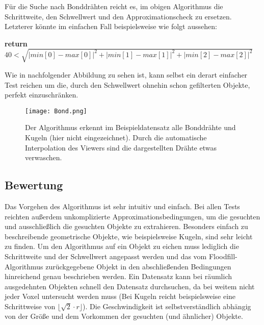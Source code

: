 Für die Suche nach Bonddrähten reicht es, im obigen Algorithmus die Schrittweite, den Schwellwert und den Approximationscheck zu ersetzen. Letzterer könnte im einfachen Fall beispielsweise wie folgt aussehen:
\newline
\begin{algorithmic}
\State \bf{return} $40 < \sqrt{|min[0]-max[0]|^2 + |min[1]-max[1]|^2 + |min[2]-max[2]|^2}$
\EndProcedure \newline
\end{algorithmic}

Wie in nachfolgender Abbildung zu sehen ist, kann selbst ein derart einfacher Test reichen um die, durch den Schwellwert ohnehin schon gefilterten Objekte, perfekt einzuschränken.

\begin{figure}[H]
  \begin{center}
    \texttt{[image: Bond.png]}
    \caption{Der Algorithmus erkennt im Beispieldatensatz alle Bonddrähte und Kugeln (hier nicht eingezeichnet). Durch die automatische Interpolation des Viewers sind die dargestellten Drähte etwas verwaschen.}
    \label{fig:Bond}
  \end{center}
\end{figure} 

\subsection{Bewertung}
Das Vorgehen des Algorithmus ist sehr intuitiv und einfach. Bei allen Tests reichten außerdem unkomplizierte Approximationsbedingungen, um die gesuchten und ausschließlich die gesuchten Objekte zu extrahieren.
Besonders einfach zu beschreibende geometrische Objekte, wie beispielsweise Kugeln, sind sehr leicht  zu finden. \newline 
Um den Algorithmus auf ein Objekt zu eichen muss lediglich die Schrittweite und der Schwellwert angepasst werden und das vom Floodfill-Algorithmus zurückgegebene Objekt in den abschließenden Bedingungen hinreichend genau beschrieben werden. \newline
Ein Datensatz kann bei räumlich ausgedehnten Objekten schnell den Datensatz durchsuchen, da bei weitem nicht jeder Voxel untersucht werden muss (Bei Kugeln reicht beispielsweise eine Schrittweise von $\lfloor \sqrt{2} \cdot r \rfloor$). Die Geschwindigkeit ist selbstverständlich abhängig von der Größe und dem Vorkommen der gesuchten (und ähnlicher) Objekte.

